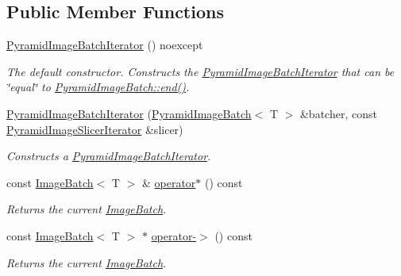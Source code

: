 \subsection*{Public Member Functions}
\begin{DoxyCompactItemize}
\item 
\hyperlink{group___imagery_module_ga9859e48a78c1a93cbc5d6ec39bfa33c4}{Pyramid\+Image\+Batch\+Iterator} () noexcept
\begin{DoxyCompactList}\small\item\em The default constructor. Constructs the \hyperlink{classdg_1_1deepcore_1_1imagery_1_1_pyramid_image_batch_iterator}{Pyramid\+Image\+Batch\+Iterator} that can be \char`\"{}equal\char`\"{} to \hyperlink{group___imagery_module_ga7e2fa7f2608bc1784f52c8f165fcc2f7}{Pyramid\+Image\+Batch\+::end()}. \end{DoxyCompactList}\item 
\hyperlink{group___imagery_module_gafaa065adfee60c6db16f2c398c438400}{Pyramid\+Image\+Batch\+Iterator} (\hyperlink{classdg_1_1deepcore_1_1imagery_1_1_pyramid_image_batch}{Pyramid\+Image\+Batch}$<$ T $>$ \&batcher, const \hyperlink{classdg_1_1deepcore_1_1imagery_1_1_pyramid_image_slicer_iterator}{Pyramid\+Image\+Slicer\+Iterator} \&slicer)
\begin{DoxyCompactList}\small\item\em Constructs a \hyperlink{classdg_1_1deepcore_1_1imagery_1_1_pyramid_image_batch_iterator}{Pyramid\+Image\+Batch\+Iterator}. \end{DoxyCompactList}\item 
const \hyperlink{classdg_1_1deepcore_1_1imagery_1_1_image_batch}{Image\+Batch}$<$ T $>$ \& \hyperlink{group___imagery_module_gac21ea85be8311510322c9fdd5c9ebe50}{operator$\ast$} () const 
\begin{DoxyCompactList}\small\item\em Returns the current \hyperlink{classdg_1_1deepcore_1_1imagery_1_1_image_batch}{Image\+Batch}. \end{DoxyCompactList}\item 
const \hyperlink{classdg_1_1deepcore_1_1imagery_1_1_image_batch}{Image\+Batch}$<$ T $>$ $\ast$ \hyperlink{group___imagery_module_gaccd917f1703532af22119b69f9f87acc}{operator-\/$>$} () const 
\begin{DoxyCompactList}\small\item\em Returns the current \hyperlink{classdg_1_1deepcore_1_1imagery_1_1_image_batch}{Image\+Batch}. \end{DoxyCompactList}\item 

\end{DoxyCompactItemize}
